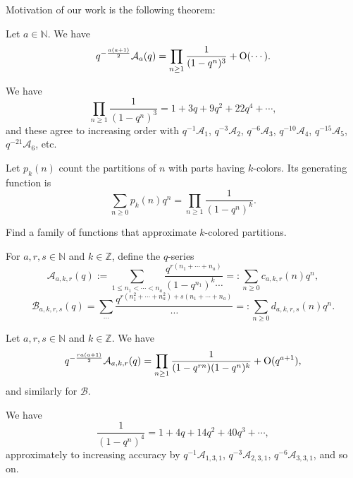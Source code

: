 \documentclass[reqno]{amsart} 
\begin{document}
Motivation of our work is the following theorem:
\begin{theorem}
  Let $a \in \mathbb{N}$.  We have
  \begin{equation*}
    q^{- \frac{a(a + 1)}{2}} \mathcal{A}_a(q) = \prod_{n \geq 1} \frac{1}{(1 - q^n)^3} + \operatorname{O}(\dotsb).
  \end{equation*}
\end{theorem}
\begin{example}
  We have
  \begin{equation*}
    \prod_{n \geq 1} \frac{1}{(1 - q^n)^3}
    = 1 + 3 q + 9 q^2 + 22 q^4 + \dotsb,
  \end{equation*}
  and these agree to increasing order with $q^{-1} \mathcal{A}_1$, $q^{- 3} \mathcal{A}_2$, $q^{- 6} \mathcal{A}_3$, $q^{-10} \mathcal{A}_4$, $q^{-15} \mathcal{A}_5$, $q^{- 21} \mathcal{A}_6$, etc.
\end{example}

Let $p_k(n)$ count the partitions of $n$ with parts having $k$-colors.  Its generating function is
\begin{equation*}
  \sum_{n \geq 0} p_k(n) q^n = \prod_{n \geq 1}
  \frac{1}{(1 - q^n)^k}.
\end{equation*}
\begin{question}[Ono]
  Find a family of functions that approximate $k$-colored partitions.
\end{question}

\begin{definition}
  For $a, r, s \in \mathbb{N}$ and $k \in \mathbb{Z}$, define the $q$-series
  \begin{equation*}
    \mathcal{A}_{a, k, r}(q) := \sum_{1 \leq n_1 < \dotsb < n_a}
    \frac{q^{r(n_1 + \dotsb + n_a)}}{(1 - q^{n_1})^k \dotsb} =: \sum_{n \geq 0} c_{a, k, r}(n) q^n,
  \end{equation*}
  \begin{equation*}
    \mathcal{B}_{a, k, r, s}(q) = \sum_{\dotsb}
    \frac{q^{r(n_1^2 + \dotsb + n_a^2) + s(n_1 + \dotsb + n_a)}}{\dotsb}
    =: \sum_{n \geq 0} d_{a,k,r,s}(n) q^n.
  \end{equation*}
\end{definition}

\begin{theorem}
  Let $a, r, s \in \mathbb{N}$ and $k \in \mathbb{Z}$.  We have
  \begin{equation*}
    q^{- \frac{r a(a + 1)}{2}} \mathcal{A}_{a, k, r}(q) = \prod_{n \geq 1}
    \frac{1}{(1 - q^{r n})(1 - q^n)^k}
    + \operatorname{O}(q^{a + 1}),
  \end{equation*}
  and similarly for $\mathcal{B}$.
\end{theorem}
\begin{example}
  We have
  \begin{equation*}
    \frac{1}{(1 - q^n)^4} = 1 + 4 q + 14 q^2 + 40 q^3 + \dotsb,
  \end{equation*}
  approximately to increasing accuracy by $q^{-1} \mathcal{A}_{1, 3, 1}$, $q^{- 3} \mathcal{A}_{2, 3, 1}$, $q^{- 6} \mathcal{A}_{3, 3, 1}$, and so on.
\end{example}
\end{document}
